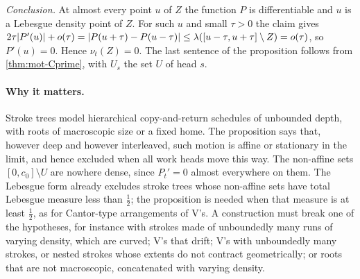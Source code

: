 \begin{informalproof}
\emph{Conclusion.} At almost every point $u$ of $Z$ the function $P$ is differentiable and $u$ is a Lebesgue density point
of $Z$. For such $u$ and small $\tau>0$ the claim gives
$2\tau\lvert P'(u) \rvert+o(\tau)=\lvert P(u+\tau)-P(u-\tau) \rvert\le\lambda([u-\tau,u+\tau]\setminus Z)=o(\tau)$, so $P'(u)=0$. Hence $\nu_t(Z)=0$. The
last sentence of the proposition follows from \cref{thm:mot-Cprime}, with $U_s$ the set $U$ of head $s$.
\end{informalproof}

\paragraph{Why it matters.} Stroke trees model hierarchical copy-and-return schedules of unbounded depth, with roots of
macroscopic size or a fixed home. The proposition says that, however deep and however interleaved, such motion is
affine or stationary in the limit, and hence excluded when all work heads move this way. The non-affine sets
$[0,c_0]\setminus U$ are nowhere dense, since $P_t'=0$ almost everywhere on them. The Lebesgue form already excludes stroke trees whose non-affine sets have total
Lebesgue measure less than $\frac12$; the proposition is needed when that measure is at least $\frac12$, as for
Cantor-type arrangements of V's. A construction must break one of
the hypotheses, for instance with strokes made of unboundedly many runs of varying density, which are curved; V's that
drift; V's with unboundedly many strokes, or nested strokes whose extents do not contract geometrically; or roots that
are not macroscopic, concatenated with varying density.

